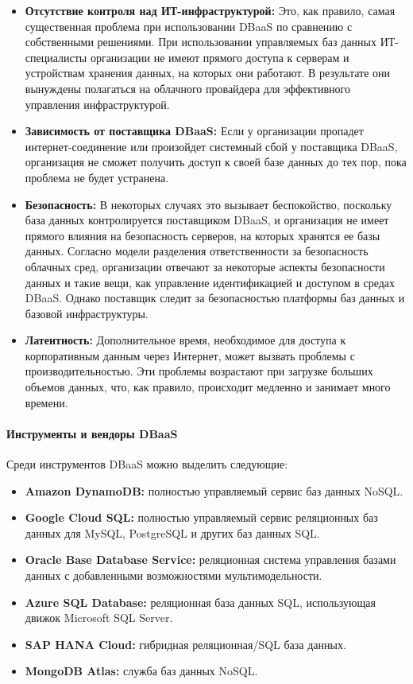 \begin{itemize}
\item \textbf{Отсутствие контроля над ИТ-инфраструктурой:} Это, как правило, самая существенная проблема при использовании DBaaS по сравнению с собственными решениями. При использовании управляемых баз данных ИТ-специалисты организации не имеют прямого доступа к серверам и устройствам хранения данных, на которых они работают. В результате они вынуждены полагаться на облачного провайдера для эффективного управления инфраструктурой.
\item \textbf{Зависимость от поставщика DBaaS:} Если у организации пропадет интернет-соединение или произойдет системный сбой у поставщика DBaaS, организация не сможет получить доступ к своей базе данных до тех пор, пока проблема не будет устранена.
\item \textbf{Безопасность:} В некоторых случаях это вызывает беспокойство, поскольку база данных контролируется поставщиком DBaaS, и организация не имеет прямого влияния на безопасность серверов, на которых хранятся ее базы данных. Согласно модели разделения ответственности за безопасность облачных сред, организации отвечают за некоторые аспекты безопасности данных и такие вещи, как управление идентификацией и доступом в средах DBaaS. Однако поставщик следит за безопасностью платформы баз данных и базовой инфраструктуры.
\item \textbf{Латентность:} Дополнительное время, необходимое для доступа к корпоративным данным через Интернет, может вызвать проблемы с производительностью. Эти проблемы возрастают при загрузке больших объемов данных, что, как правило, происходит медленно и занимает много времени.
\end{itemize}

\paragraph{Инструменты и вендоры DBaaS}

Среди инструментов DBaaS можно выделить следующие: \autocite{DBaaS}

\begin{itemize}
\item \textbf{Amazon DynamoDB:} полностью управляемый сервис баз данных NoSQL.
\item \textbf{Google Cloud SQL:} полностью управляемый сервис реляционных баз данных для MySQL, PostgreSQL и других баз данных SQL.
\item \textbf{Oracle Base Database Service:} реляционная система управления базами данных с добавленными возможностями мультимодельности.
\item \textbf{Azure SQL Database:} реляционная база данных SQL, использующая движок Microsoft SQL Server.
\item \textbf{SAP HANA Cloud:} гибридная реляционная/SQL база данных.
\item \textbf{MongoDB Atlas:} служба баз данных NoSQL.
\end{itemize}



	